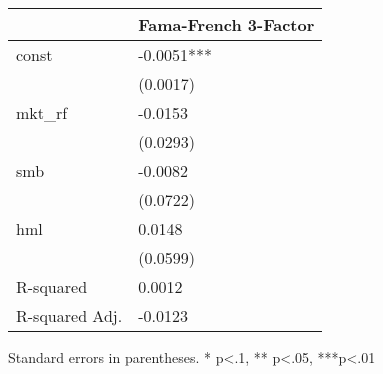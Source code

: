 \begin{table}
\caption{}
\label{}
\begin{center}
\begin{tabular}{ll}
\hline
               & Fama-French 3-Factor  \\
\hline
const          & -0.0051***            \\
               & (0.0017)              \\
mkt\_rf        & -0.0153               \\
               & (0.0293)              \\
smb            & -0.0082               \\
               & (0.0722)              \\
hml            & 0.0148                \\
               & (0.0599)              \\
R-squared      & 0.0012                \\
R-squared Adj. & -0.0123               \\
\hline
\end{tabular}
\end{center}
\end{table}
\bigskip
Standard errors in parentheses. \newline 
* p<.1, ** p<.05, ***p<.01